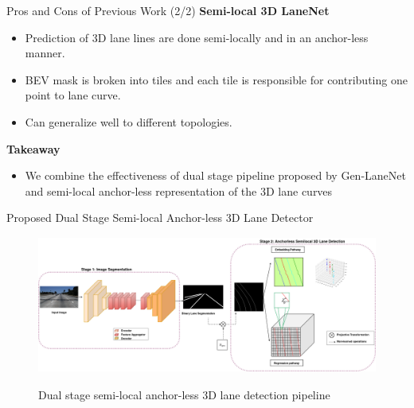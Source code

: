 \documentclass[aspectratio=169]{beamer}
\begin{document}
\begin{frame}{Pros and Cons of Previous Work (2/2)}
    \textbf{Semi-local 3D LaneNet}
    \begin{itemize}
        \item Prediction of 3D lane lines are done semi-locally and in an anchor-less manner. 
        \item BEV mask is broken into tiles and each tile is responsible for contributing one point to lane curve.
        \item Can generalize well to different topologies.
    \end{itemize}


\textbf{Takeaway}
\begin{itemize}
    \item We combine the effectiveness of dual stage pipeline proposed by Gen-LaneNet and semi-local anchor-less representation of the 3D lane curves  
\end{itemize}
\end{frame}

\begin{frame}{Proposed Dual Stage Semi-local Anchor-less 3D Lane Detector}


 \begin{figure}[H]
     \centering
     
\includegraphics[width=0.8\linewidth, height=4.5cm]{images/3DlaneAUXNet.png} 
\label{fig:subim1}

\caption{Dual stage semi-local anchor-less 3D lane detection pipeline }
\label{fig:image2}
\end{figure}
\end{frame}




\begin{frame}
\printbibliography
\end{frame}
\end{document}
